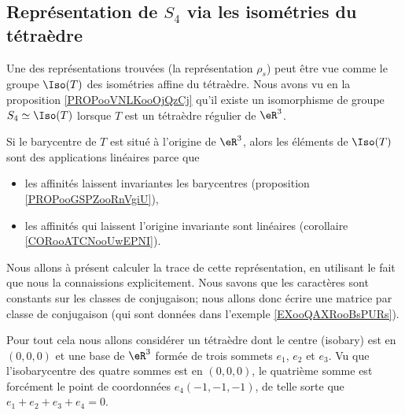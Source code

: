 \subsection{Représentation de \( S_4\) via les isométries du tétraèdre}
\label{SUBSECooLEUAooGGjGIZ}

Une des représentations trouvées (la représentation \( \rho_s\)) peut être vue comme le groupe \( \Iso(T)\) des isométries affine du tétraèdre. Nous avons vu en la proposition \ref{PROPooVNLKooOjQzCj} qu'il existe un isomorphisme de groupe \( S_4\simeq \Iso(T)\) lorsque \( T\) est un tétraèdre régulier de \( \eR^3\).

Si le barycentre de \( T\) est situé à l'origine de \( \eR^3\), alors les éléments de \( \Iso(T)\) sont des applications linéaires parce que
\begin{itemize}
    \item les affinités laissent invariantes les barycentres (proposition \ref{PROPooGSPZooRnVgiU}),
    \item les affinités qui laissent l'origine invariante sont linéaires (corollaire \ref{CORooATCNooUwEPNI}).
\end{itemize}
Nous allons à présent calculer la trace de cette représentation, en utilisant le fait que nous la connaissions explicitement. Nous savons que les caractères sont constants sur les classes de conjugaison; nous allons donc écrire une matrice par classe de conjugaison (qui sont données dans l'exemple \ref{EXooQAXRooBsPURs}). 

Pour tout cela nous allons considérer un tétraèdre dont le centre (isobary) est en \( (0,0,0)\) et une base de \( \eR^3\) formée de trois sommets \( e_1\), \( e_2\) et \( e_3\). Vu que l'isobarycentre des quatre sommes est en \( (0,0,0)\), le quatrième somme est forcément le point de coordonnées \( e_4(-1,-1,-1)\), de telle sorte que \( e_1+e_2+e_3+e_4=0\).

